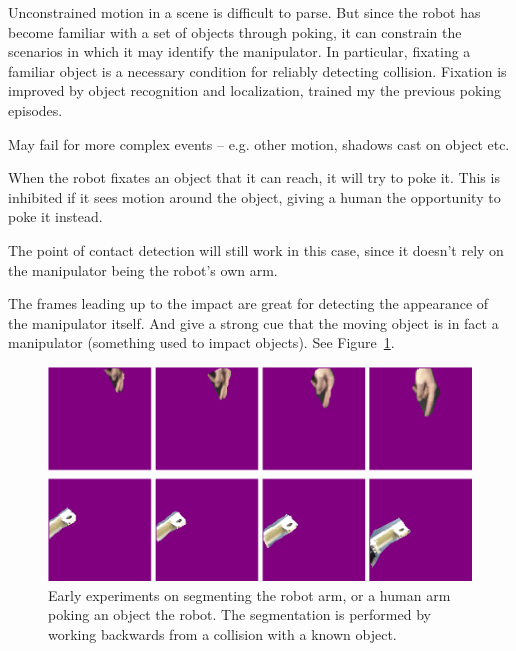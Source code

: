 
\ifverbose

Unconstrained motion in a scene is difficult to parse.  But since the
robot has become familiar with a set of objects through poking, it can
constrain the scenarios in which it may identify the manipulator.  In
particular, fixating a familiar object is a necessary condition for
reliably detecting collision.  Fixation is improved by object recognition
and localization, trained my the previous poking episodes.

May fail for more complex events -- e.g. other motion, shadows cast on
object etc.

When the robot fixates an object that it can reach, it will try to poke it.
This is inhibited if it sees motion around the object, giving a human the
opportunity to poke it instead.

The point of contact detection will still work in this case, since it 
doesn't rely on the manipulator being the robot's own arm.

The frames leading up to the impact are great for detecting the
appearance of the manipulator itself.  And give a strong cue that the
moving object is in fact a manipulator (something used to impact
objects).  See Figure~\ref{fig:manipulator}.

\fi

\begin{figure}[tbh]
  \centerline{\includegraphics[width=12cm]{fig-poke-manipulator}}
  \caption{Early experiments on segmenting the robot arm, or a 
human arm poking an object the robot.  The segmentation is
performed by working
backwards from a collision with a known object.}
  \label{fig:manipulator}
\end{figure}

